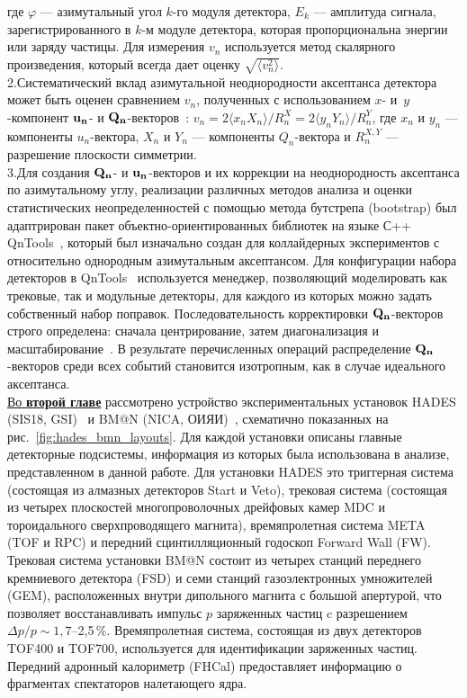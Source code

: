 где $\varphi$ --- азимутальный угол $k$-го модуля детектора, $E_k$ --- амплитуда сигнала, зарегистрированного в
$k$-м модуле детектора, которая пропорциональна энергии или заряду частицы. Для измерения $v_n$ используется метод
скалярного произведения, который всегда дает оценку $\sqrt{ \langle v_n^2 \rangle }$. \\
2.\;Систематический вклад азимутальной неоднородности аксептанса детектора может быть оценен сравнением $v_n$,
полученных с использованием $x$- и~$y$-компонент ${\bf u_n}$- и ${\bf Q_n}$-векторов~\cite{Selyuzhenkov:2007zi}: $v_n =  2 \langle x_n X_n \rangle/R_n^X = 2 \langle y_n Y_n \rangle/R_n^Y$,
где $x_n$ и $y_n$ --- компоненты $u_n$-вектора, $X_n$ и $Y_n$ --- компоненты $Q_n$-вектора и $R_n^{X,Y}$ --- разрешение плоскости симметрии.\\
3.\;Для создания  ${\bf Q_n}$- и ${\bf u_n}$-векторов и их коррекции на неоднородность аксептанса по азимутальному углу,
реализации различных методов анализа  и оценки статистических 
неопределенностей с помощью метода бутстрепа (bootstrap) был адаптрирован  пакет объектно-ориентированных библиотек на языке С++ QnTools~\cite{QnTools},
который  был изначально создан для коллайдерных экспериментов с относительно однородным азимутальным аксептансом. 
Для конфигурации набора детекторов в  QnTools~\cite{QnTools} используется менеджер, позволяющий моделировать как трековые,
так и модульные детекторы, для каждого из которых можно задать собственный набор поправок. 
Последовательность корректировки ${\bf Q_n}$-векторов строго определена: сначала центрирование, затем
диагонализация и масштабирование~\cite{Selyuzhenkov:2007zi}.
В результате перечисленных операций распределение ${\bf Q_n}$-векторов среди всех событий становится изотропным,
как в случае идеального аксептанса.\\
\underline{Во  \textbf{второй главе}} рассмотрено устройство экспериментальных установок HADES (SIS18, GSI)~\cite{HADES:2009aat} и  BM@N (NICA, ОИЯИ)~\cite{bmn},
схематично показанных на рис.~\ref{fig:hades_bmn_layouts}. Для каждой установки   описаны главные детекторные подсистемы, информация из которых была использована
в анализе, представленном в данной работе. Для установки HADES это триггерная система (состоящая из алмазных детекторов Start и Veto), трековая система (состоящая
из четырех плоскостей многопроволочных дрейфовых камер MDC и тороидального сверхпроводящего магнита),  времяпролетная система META (TOF и RPC) и
передний  сцинтилляционный годоскоп Forward Wall (FW).\\
Трековая система установки BM@N состоит из четырех станций переднего кремниевого детектора (FSD) и семи станций газоэлектронных умножителей (GEM), расположенных
внутри дипольного магнита с большой апертурой, что позволяет восстанавливать импульс $p$ заряженных частиц c разрешением  $\Delta p/p \sim 1{,}7$--2,5\,$\%$.
Времяпролетная система, состоящая из двух детекторов TOF400 и TOF700, используется для идентификации заряженных частиц.
Передний адронный калориметр (FHCal) предоставляет информацию о фрагментах спектаторов налетающего ядра.

